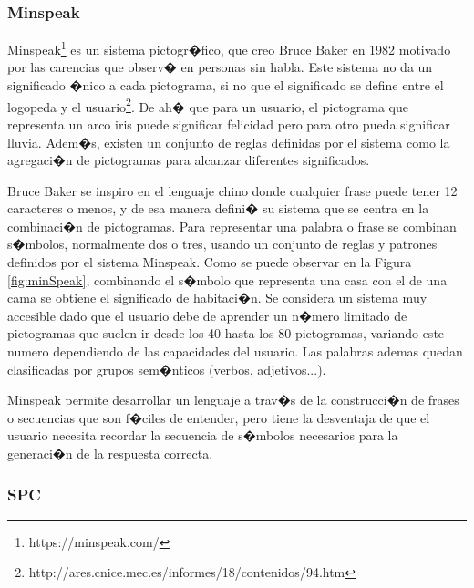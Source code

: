 \subsubsection{Minspeak}

Minspeak\footnote{https://minspeak.com/} es un sistema pictogr�fico, que creo Bruce Baker en 1982 motivado por las carencias que observ� en personas sin habla. Este sistema no da un significado �nico a cada pictograma, si no que el significado se define entre el logopeda y el usuario\footnote{http://ares.cnice.mec.es/informes/18/contenidos/94.htm}. De ah� que para un usuario, el pictograma que representa un arco iris puede significar felicidad pero para otro pueda significar lluvia. Adem�s, existen un conjunto de reglas definidas por el sistema como la agregaci�n de pictogramas para alcanzar diferentes significados.

Bruce Baker se inspiro en el lenguaje chino donde cualquier frase puede tener 12 caracteres o menos, y de esa manera defini� su sistema que se centra en la combinaci�n de pictogramas\citep{marin2003}. Para representar una palabra o frase se combinan s�mbolos, normalmente  dos o tres, usando un conjunto de reglas y patrones definidos por el sistema Minspeak. Como se puede observar en la Figura \ref{fig:minSpeak}, combinando el s�mbolo que representa una casa con el de una cama se obtiene el significado de habitaci�n. Se considera un sistema muy accesible dado que el usuario debe de aprender un n�mero limitado de pictogramas que suelen ir desde los 40 hasta los 80 pictogramas, variando este numero dependiendo de las capacidades del usuario. Las palabras ademas quedan clasificadas por grupos sem�nticos (verbos, adjetivos...).

Minspeak permite desarrollar un lenguaje a trav�s de la construcci�n de frases o secuencias que son f�ciles de entender, pero tiene la desventaja de que el usuario necesita recordar la secuencia de s�mbolos necesarios para la generaci�n de la respuesta correcta.



\subsubsection{SPC}

